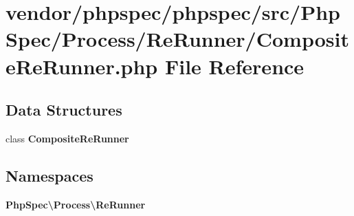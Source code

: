 \section{vendor/phpspec/phpspec/src/\+Php\+Spec/\+Process/\+Re\+Runner/\+Composite\+Re\+Runner.php File Reference}
\label{_composite_re_runner_8php}
\subsection*{Data Structures}
\begin{DoxyCompactItemize}
\item 
class {\bf Composite\+Re\+Runner}
\end{DoxyCompactItemize}
\subsection*{Namespaces}
\begin{DoxyCompactItemize}
\item 
 {\bf Php\+Spec\textbackslash{}\+Process\textbackslash{}\+Re\+Runner}
\end{DoxyCompactItemize}
